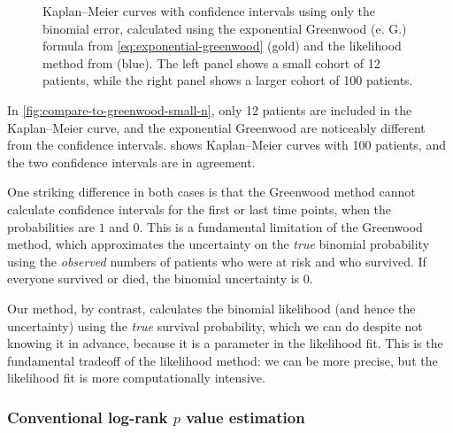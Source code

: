 \documentclass[article]{jss}
\newcommand{\KM}{Kaplan--Meier} %
\begin{document}
\begin{figure}
\begin{subfigure}[t]{0.49\textwidth}
  \caption{\label{fig:compare-to-greenwood-large-n}}
\end{subfigure}
\caption{\label{fig:compare-to-greenwood} \KM{} curves with confidence intervals using only the binomial error, calculated using the exponential Greenwood (e. G.) formula from \cref{eq:exponential-greenwood} (gold) and the likelihood method from  (blue).  The left panel shows a small cohort of 12 patients, while the right panel shows a larger cohort of 100 patients.}
\end{figure}

In \cref{fig:compare-to-greenwood-small-n}, only 12 patients are included in the \KM{} curve, and the exponential Greenwood are noticeably different from the  confidence intervals.   shows \KM{} curves with 100 patients, and the two confidence intervals are in agreement.

One striking difference in both cases is that the Greenwood method cannot calculate confidence intervals for the first or last time points, when the probabilities are \(1\) and \(0\).  This is a fundamental limitation of the Greenwood method, which approximates the uncertainty on the \emph{true} binomial probability using the \emph{observed} numbers of patients who were at risk and who survived.  If everyone survived or died, the binomial uncertainty is \(0\).

Our method, by contrast, calculates the binomial likelihood (and hence the uncertainty) using the \emph{true} survival probability, which we can do despite not knowing it in advance, because it is a parameter in the likelihood fit.  This is the fundamental tradeoff of the likelihood method: we can be more precise, but the likelihood fit is more computationally intensive.

\subsubsection[Conventional log-rank p value estimation]{Conventional log-rank \(p\) value estimation}\label{sec:compare-to-conventional-p-value}
\end{document}
